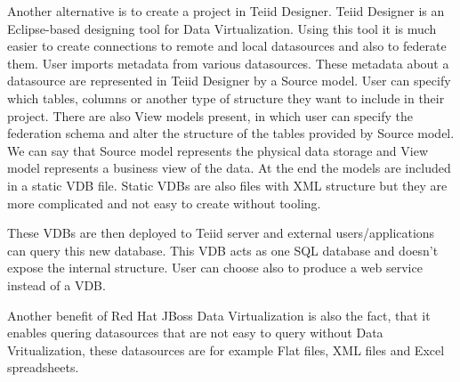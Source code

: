 \documentclass[12pt,oneside]{fithesis2}
\begin{document}
\par Another alternative is to create a project in Teiid Designer. Teiid Designer is an Eclipse-based designing tool for Data Virtualization. Using this tool it is much easier to create connections to remote and local datasources and also to federate them. User imports metadata from various datasources. These metadata about a datasource are represented in Teiid Designer by a Source model. User can specify which tables, columns or another type of structure they want to include in their project. There are also View models present, in which user can specify the federation schema and alter the structure of the tables provided by Source model. We can say that Source model represents the physical data storage and View model represents a business view of the data. At the end the models are included in a static VDB file. Static VDBs are also files with XML structure but they are more complicated and not easy to create without tooling. 
\par These VDBs are then deployed to Teiid server and external users/applications can query this new database. This VDB acts as one SQL database and doesn't expose the internal structure. User can choose also to produce a web service instead of a VDB. 
\par Another benefit of Red Hat JBoss Data Virtualization is also the fact, that it enables quering datasources that are not easy to query without Data Vritualization, these datasources are for example Flat files, XML files and Excel spreadsheets.
\end{document}
